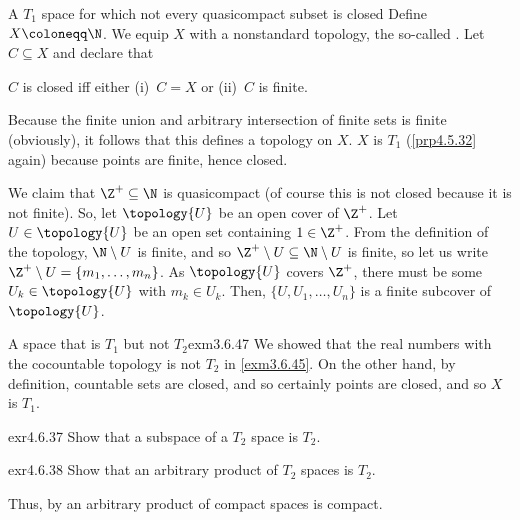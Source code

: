 \begin{exm}{A $T_1$ space for which not every quasicompact subset is closed}{}
Define $X\coloneqq \N$.  We equip $X$ with a nonstandard topology, the so-called .  Let $C\subseteq X$ and declare that
\begin{textequation}
$C$ is closed iff either (i)~$C=X$ or (ii)~$C$ is finite.
\end{textequation}
Because the finite union and arbitrary intersection of finite sets is finite (obviously), it follows that this defines a topology on $X$.  $X$ is $T_1$ (\cref{prp4.5.32} again) because points are finite, hence closed.

We claim that $\Z ^+\subseteq \N$ is quasicompact (of course this is not closed because it is not finite).  So, let $\topology{U}$ be an open cover of $\Z ^+$.  Let $U\in \topology{U}$ be an open set containing $1\in \Z ^+$.  From the definition of the topology, $\N \setminus U$ is finite, and so $\Z ^+\setminus U\subseteq \N \setminus U$ is finite, so let us write $\Z ^+\setminus U=\{ m_1,\ldots ,m_n\}$.  As $\topology{U}$ covers $\Z ^+$, there must be some $U_k\in \topology{U}$ with $m_k\in U_k$.  Then, $\{ U,U_1,\ldots ,U_n\}$ is a finite subcover of $\topology{U}$.
\end{exm}
\begin{exm}{A space that is $T_1$ but not $T_2$}{exm3.6.47}
We showed that the real numbers with the cocountable topology is not $T_2$ in \cref{exm3.6.45}.  On the other hand, by definition, countable sets are closed, and so certainly points are closed, and so $X$ is $T_1$.
\end{exm}
\begin{exr}{}{exr4.6.37}
Show that a subspace of a $T_2$ space is $T_2$.
\end{exr}
\begin{exr}{}{exr4.6.38}
Show that an arbitrary product of $T_2$ spaces is $T_2$.
\begin{rmk}
Thus, by  an arbitrary product of compact spaces is compact.
\end{rmk}
\end{exr}

